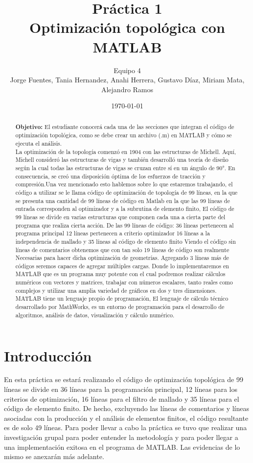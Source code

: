 \documentclass{article}
\author{Equipo 4 \\Jorge  Fuentes, Tania  Hernandez,
 Anahi Herrera, Gustavo  Díaz, Miriam  Mata, Alejandro Ramos} %
\title{Práctica 1 \\ Optimización topológica con MATLAB} %
\date{\today}
\begin{document}
\maketitle %
\begin{abstract} %
 \textbf{Objetivo:} El estudiante conocerá cada una de las secciones que integran el código de optimización topológica, como se debe crear un archivo (.m) en MATLAB y cómo se ejecuta el análisis.\\
 La optimización de la topología comenzó en 1904 con las estructuras de Michell. Aquí, Michell consideró las estructuras de vigas y también desarrolló una teoría de diseño según la cual todas las estructuras de vigas se cruzan entre sí en un ángulo de 90°. En consecuencia, se creó una disposición óptima de los esfuerzos de tracción y compresión.Una vez mencionado esto hablemos sobre lo que estaremos trabajando, el código a utilizar se le llama código de optimización de topología de 99 líneas, en la que se presenta una cantidad de 99 líneas de código en Matlab en la que las 99 líneas de entrada corresponden al optimizador y a la subrutina de elemento finito, El código de 99 líneas se divide en varias estructuras que componen cada una a cierta parte del programa que realiza cierta acción. De las 99 líneas de código: 36 líneas pertenecen al programa principal 12 líneas pertenecen a criterio optimizador 16 líneas a la independencia de mallado y 35 líneas al código de elemento finito Viendo el código sin líneas de comentarios obtenemos que con tan solo 19 líneas de código son realmente Necesarias para hacer dicha optimización de geometrías. Agregando 3 líneas más de códigos seremos capaces de agregar múltiples cargas. Donde lo implementaremos en MATLAB que es un programa muy potente con el cual podremos realizar cálculos numéricos con vectores y matrices, trabajar con números escalares, tanto reales como complejos y utilizar una amplia variedad de gráficos en dos y tres dimensiones. MATLAB tiene un lenguaje propio de programación, El lenguaje de cálculo técnico desarrollado por MathWorks, es un entorno de programación para el desarrollo de algoritmos, análisis de datos, visualización y cálculo numérico.
\end{abstract}
\newpage
\tableofcontents
\section{Introducción}\label{intro} %
En esta práctica se estará realizando el código de optimización topológica de 99 líneas se divide en 36 líneas para la programación principal, 12 líneas para los criterios de optimización, 16 líneas para el filtro de mallado y 35 líneas para el código de elemento finito. De hecho, excluyendo las líneas de comentarios y líneas asociadas con la producción y el análisis de elementos finitos, el código resultante es de solo 49 líneas.
Para poder llevar a cabo la práctica se tuvo que realizar una investigación grupal para poder entender la metodología y para poder llegar a una implementación exitosa en el programa de MATLAB. Las evidencias de lo mismo se anexarán más adelante. 
\end{document}
